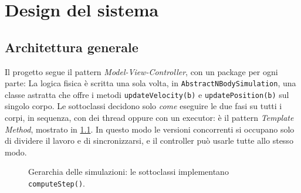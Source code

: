 \chapter{Design del sistema}

%
%
\section{Architettura generale}
Il progetto segue il pattern \emph{Model-View-Controller}, con un package per ogni parte:
La logica fisica è scritta una sola volta, in \texttt{AbstractNBodySimulation}, una classe astratta che offre i metodi \texttt{updateVelocity(b)} e \texttt{updatePosition(b)} sul singolo corpo.
Le sottoclassi decidono solo \emph{come} eseguire le due fasi su tutti i corpi, in sequenza, con dei thread oppure con un executor: è il pattern \emph{Template Method}, mostrato in \cref{fig:gerarchia}.
In questo modo le versioni concorrenti si occupano solo di dividere il lavoro e di sincronizzarsi, e il controller può usarle tutte allo stesso modo.

\begin{figure}[H]
  \centering
  \caption{Gerarchia delle simulazioni: le sottoclassi implementano \texttt{computeStep()}.}
  \label{fig:gerarchia}
\end{figure}

%
%
